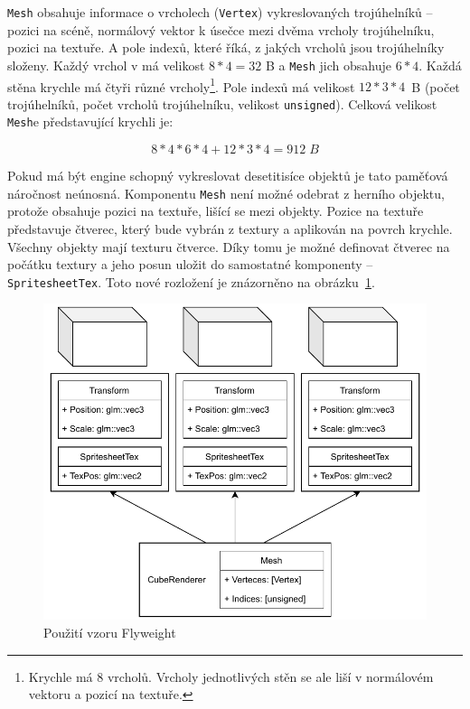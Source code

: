 \documentclass[thesis=M,czech]{FITthesis}[2019/12/23]
\begin{document}
\texttt{Mesh} obsahuje informace o vrcholech (\texttt{Vertex}) vykreslovaných trojúhelníků -- pozici na scéně, normálový vektor k úsečce mezi dvěma vrcholy trojúhelníku, pozici na textuře. A pole indexů, které říká, z jakých vrcholů jsou trojúhelníky složeny. Každý vrchol v má velikost $8 * 4 = 32$ B a \texttt{Mesh} jich obsahuje $6 * 4$. Každá stěna krychle má čtyři různé vrcholy\footnote{Krychle má 8 vrcholů. Vrcholy jednotlivých stěn se ale liší v normálovém vektoru a pozicí na textuře.}. Pole indexů má velikost $12 * 3 * 4$~B (počet trojúhelníků, počet vrcholů trojúhelníku, velikost \texttt{unsigned}). Celková velikost \texttt{Mesh}e představující krychli je:

\[8 * 4 * 6 * 4 + 12 * 3 * 4 = 912\; B\]

Pokud má být engine schopný vykreslovat desetitisíce objektů je tato paměťová náročnost neúnosná. Komponentu \texttt{Mesh} není možné odebrat z herního objektu, protože obsahuje pozici na textuře, lišící se mezi objekty. Pozice na textuře představuje čtverec, který bude vybrán z textury a aplikován na povrch krychle. Všechny objekty mají texturu čtverce. Díky tomu je možné definovat čtverec na počátku textury a jeho posun uložit do samostatné komponenty -- \texttt{SpritesheetTex}. Toto nové rozložení je znázorněno na obrázku~\ref{fig:go_components_fw}.

\begin{figure}\centering
	\includegraphics[width=\textwidth]{images/go_components_fw_2}
	\caption[Použití vzoru Flyweight]{Použití vzoru Flyweight}\label{fig:go_components_fw}
\end{figure}
\end{document}
